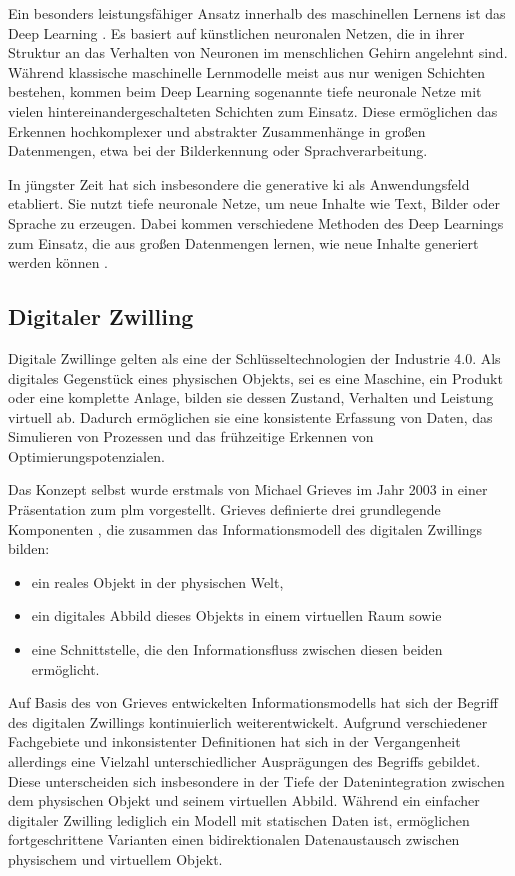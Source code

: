 Ein besonders leistungsfähiger Ansatz innerhalb des maschinellen Lernens ist das Deep Learning \cite{DLEinordnung}.
Es basiert auf künstlichen neuronalen Netzen, die in ihrer Struktur an das Verhalten von Neuronen im menschlichen Gehirn angelehnt sind.
Während klassische maschinelle Lernmodelle meist aus nur wenigen Schichten bestehen, kommen beim Deep Learning sogenannte tiefe neuronale Netze mit vielen hintereinandergeschalteten Schichten zum Einsatz.
Diese ermöglichen das Erkennen hochkomplexer und abstrakter Zusammenhänge in großen Datenmengen, etwa bei der Bilderkennung oder Sprachverarbeitung. \cite{DLDefinition}

In jüngster Zeit hat sich insbesondere die generative \acs{ki} als Anwendungsfeld etabliert. 
Sie nutzt tiefe neuronale Netze, um neue Inhalte wie Text, Bilder oder Sprache zu erzeugen. 
Dabei kommen verschiedene Methoden des Deep Learnings zum Einsatz, die aus großen Datenmengen lernen, wie neue Inhalte generiert werden können \cite{GenerativeKI}.

\newpage
\subsection{Digitaler Zwilling}
\label{sec: DT}
Digitale Zwillinge gelten als eine der Schlüsseltechnologien der Industrie 4.0.
Als digitales Gegenstück eines physischen Objekts, sei es eine Maschine, ein Produkt oder eine komplette Anlage, bilden sie dessen Zustand, Verhalten und Leistung virtuell ab.
Dadurch ermöglichen sie eine konsistente Erfassung von Daten, das Simulieren von Prozessen und das frühzeitige Erkennen von Optimierungspotenzialen.

Das Konzept selbst wurde erstmals von Michael Grieves im Jahr 2003 in einer Präsentation zum \ac{plm} vorgestellt. 
Grieves definierte drei grundlegende Komponenten \cite{DTGrieves}, die zusammen das Informationsmodell des digitalen Zwillings bilden:
\begin{itemize}
    \item ein reales Objekt in der physischen Welt,
    \item ein digitales Abbild dieses Objekts in einem virtuellen Raum sowie
    \item eine Schnittstelle, die den Informationsfluss zwischen diesen beiden ermöglicht.
\end{itemize}

Auf Basis des von Grieves entwickelten Informationsmodells hat sich der Begriff des digitalen Zwillings kontinuierlich weiterentwickelt.
Aufgrund verschiedener Fachgebiete und inkonsistenter Definitionen hat sich in der Vergangenheit allerdings eine Vielzahl unterschiedlicher Ausprägungen des Begriffs gebildet.
Diese unterscheiden sich insbesondere in der Tiefe der Datenintegration zwischen dem physischen Objekt und seinem virtuellen Abbild.
Während ein einfacher digitaler Zwilling lediglich ein Modell mit statischen Daten ist, ermöglichen fortgeschrittene Varianten einen bidirektionalen Datenaustausch zwischen physischem und virtuellem Objekt. 

